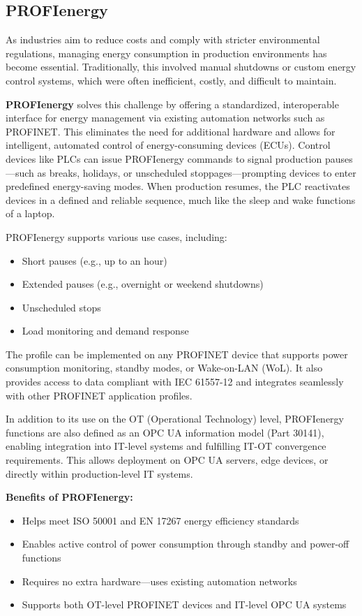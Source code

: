 \documentclass[conference]{IEEEtran}
\begin{document}
\subsection{PROFIenergy}
\label{subsec: PROFIenergy}
As industries aim to reduce costs and comply with stricter environmental regulations, managing energy consumption in production environments has become essential. Traditionally, this involved manual shutdowns or custom energy control systems, which were often inefficient, costly, and difficult to maintain.

\textbf{PROFIenergy} solves this challenge by offering a standardized, interoperable interface for energy management via existing automation networks such as PROFINET. This eliminates the need for additional hardware and allows for intelligent, automated control of energy-consuming devices (ECUs). Control devices like PLCs can issue PROFIenergy commands to signal production pauses—such as breaks, holidays, or unscheduled stoppages—prompting devices to enter predefined energy-saving modes. When production resumes, the PLC reactivates devices in a defined and reliable sequence, much like the sleep and wake functions of a laptop.

PROFIenergy supports various use cases, including:
\begin{itemize}
    \item Short pauses (e.g., up to an hour)
    \item Extended pauses (e.g., overnight or weekend shutdowns)
    \item Unscheduled stops
    \item Load monitoring and demand response
\end{itemize}

The profile can be implemented on any PROFINET device that supports power consumption monitoring, standby modes, or Wake-on-LAN (WoL). It also provides access to data compliant with IEC 61557-12 and integrates seamlessly with other PROFINET application profiles.

In addition to its use on the OT (Operational Technology) level, PROFIenergy functions are also defined as an OPC UA information model (Part 30141), enabling integration into IT-level systems and fulfilling IT-OT convergence requirements. This allows deployment on OPC UA servers, edge devices, or directly within production-level IT systems.

\textbf{Benefits of PROFIenergy:}
\begin{itemize}
    \item Helps meet ISO 50001 and EN 17267 energy efficiency standards
    \item Enables active control of power consumption through standby and power-off functions
    \item Requires no extra hardware—uses existing automation networks
    \item Supports both OT-level PROFINET devices and IT-level OPC UA systems
\end{itemize}
\end{document}
